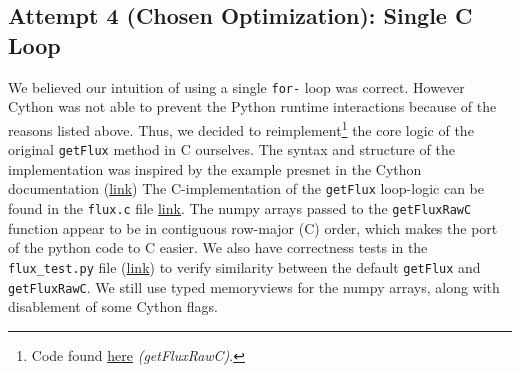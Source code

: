 \documentclass[a4paper,10pt]{article}
\begin{document}
\subsection{Attempt 4 (Chosen Optimization): Single \textbf{C} Loop}
We believed our intuition of using a single \verb|for-| loop was correct.
However Cython was not able to prevent the Python runtime interactions because of the reasons listed above.
Thus, we decided to reimplement\footnote{Code found \href{https://github.com/paulmyr/DD2358-HPC25/blob/master/10_project_rishi_paul/code/cython/finitevolume_cython_lib.pyx\#L359}{here} \emph{(getFluxRawC)}.} the core logic of the original \verb|getFlux| method in C ourselves.
The syntax and structure of the implementation was inspired by the example presnet in the Cython documentation (\href{https://docs.cython.org/en/latest/src/userguide/memoryviews.html\#pass-data-from-a-c-function-via-pointer}{link})
The C-implementation of the \verb|getFlux| loop-logic can be found in the \verb|flux.c| file \href{https://github.com/paulmyr/DD2358-HPC25/blob/master/10_project_rishi_paul/code/cython/flux.c}{link}.
The numpy arrays passed to the \verb|getFluxRawC| function appear to be in contiguous row-major (C) order, which makes the port of the python code to C easier.
We also have correctness tests in the \verb|flux_test.py| file (\href{https://github.com/paulmyr/DD2358-HPC25/blob/master/10_project_rishi_paul/code/cython/flux_test.py}{link}) to verify similarity between the default \verb|getFlux| and \verb|getFluxRawC|.
We still use typed memoryviews for the numpy arrays, along with disablement of some Cython flags. 
\end{document}
